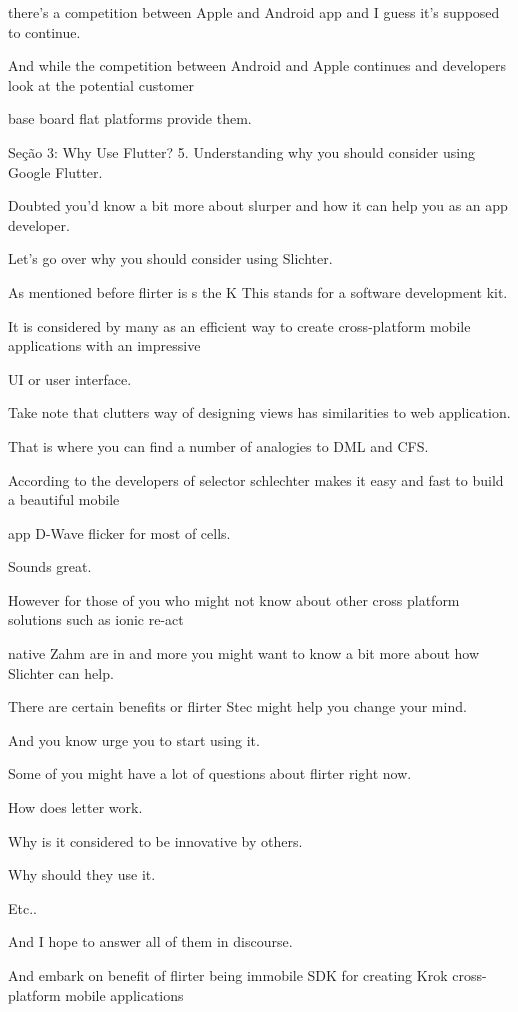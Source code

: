 there's a competition between Apple and Android app and I guess it's supposed to continue.

And while the competition between Android and Apple continues and developers look at the potential customer

base board flat platforms provide them.

Seção 3: Why Use Flutter?
5. Understanding why you should consider using Google
Flutter.


Doubted you'd know a bit more about slurper and how it can help you as an app developer.

Let's go over why you should consider using Slichter.

As mentioned before flirter is s the K This stands for a software development kit.

It is considered by many as an efficient way to create cross-platform mobile applications with an impressive

UI or user interface.

Take note that clutters way of designing views has similarities to web application.

That is where you can find a number of analogies to DML and CFS.

According to the developers of selector schlechter makes it easy and fast to build a beautiful mobile

app D-Wave flicker for most of cells.

Sounds great.

However for those of you who might not know about other cross platform solutions such as ionic re-act

native Zahm are in and more you might want to know a bit more about how Slichter can help.

There are certain benefits or flirter Stec might help you change your mind.

And you know urge you to start using it.

Some of you might have a lot of questions about flirter right now.

How does letter work.

Why is it considered to be innovative by others.

Why should they use it.

Etc..

And I hope to answer all of them in discourse.

And embark on benefit of flirter being immobile SDK for creating Krok cross-platform mobile applications

